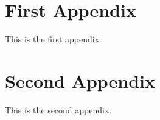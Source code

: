 \chapter{First Appendix}
This is the first appendix.

\chapter{Second Appendix}
This is the second appendix.

\clearpage

